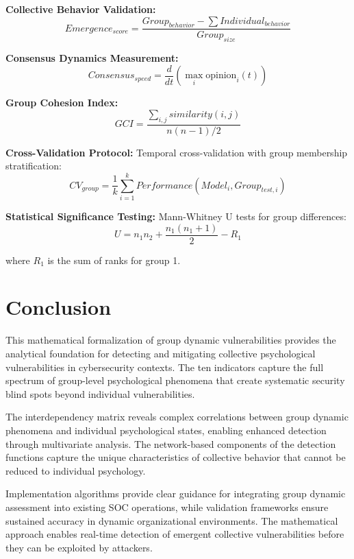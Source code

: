\documentclass[11pt,a4paper]{article}
\begin{document}
\textbf{Collective Behavior Validation:}
\begin{equation}
Emergence_{score} = \frac{Group_{behavior} - \sum Individual_{behavior}}{Group_{size}}
\end{equation}

\textbf{Consensus Dynamics Measurement:}
\begin{equation}
Consensus_{speed} = \frac{d}{dt}\left(\max_i \text{opinion}_i(t)\right)
\end{equation}

\textbf{Group Cohesion Index:}
\begin{equation}
GCI = \frac{\sum_{i,j} similarity(i,j)}{n(n-1)/2}
\end{equation}

\textbf{Cross-Validation Protocol:}
Temporal cross-validation with group membership stratification:
\begin{equation}
CV_{group} = \frac{1}{k} \sum_{i=1}^{k} Performance(Model_i, Group_{test,i})
\end{equation}

\textbf{Statistical Significance Testing:}
Mann-Whitney U tests for group differences:
\begin{equation}
U = n_1 n_2 + \frac{n_1(n_1+1)}{2} - R_1
\end{equation}

where $R_1$ is the sum of ranks for group 1.

\section{Conclusion}

This mathematical formalization of group dynamic vulnerabilities provides the analytical foundation for detecting and mitigating collective psychological vulnerabilities in cybersecurity contexts. The ten indicators capture the full spectrum of group-level psychological phenomena that create systematic security blind spots beyond individual vulnerabilities.

The interdependency matrix reveals complex correlations between group dynamic phenomena and individual psychological states, enabling enhanced detection through multivariate analysis. The network-based components of the detection functions capture the unique characteristics of collective behavior that cannot be reduced to individual psychology.

Implementation algorithms provide clear guidance for integrating group dynamic assessment into existing SOC operations, while validation frameworks ensure sustained accuracy in dynamic organizational environments. The mathematical approach enables real-time detection of emergent collective vulnerabilities before they can be exploited by attackers.
\end{document}
